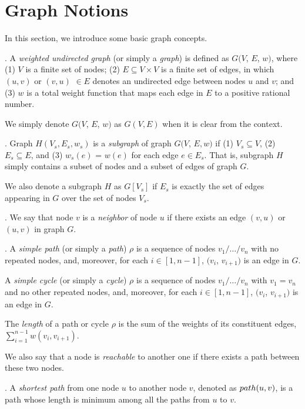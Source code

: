 \section{Graph Notions}
\label{sec-preliminary}

In this section, we introduce some basic graph concepts.

. A {\em weighted undirected graph} (or simply a {\em graph})
is defined as $G (V$, $E$, $w)$, where
(1) $V$ is a finite set of nodes;
(2) $E\subseteq V \times V$ is a finite set of edges, in which $(u, v)$ or $(v, u)$ $\in E$ denotes an undirected edge between nodes $u$ and $v$; and
(3) $w$ is a total weight function that maps each edge in $E$ to a positive rational number.

We simply denote $G (V$, $E$, $w)$ as  $G(V, E)$ when it is clear from the context.

. Graph $H(V_s, E_s,  w_{s})$ is a {\em subgraph} of graph
$G(V$, $E,  w)$ if (1) $V_s \subseteq V$, (2) $E_s \subseteq E$, and (3) $w_{s}(e)$ = $w(e)$ for each edge $e\in E_s$.
%
That is, subgraph $H$ simply contains a subset of nodes and a subset of edges of graph $G$.

We also denote a subgraph $H$ as $G[V_s]$ if $E_s$ is exactly the set of edges appearing in $G$ over the set of nodes $V_s$.


. We say that node $v$ is a {\em neighbor} of node $u$ if there exists an edge $(v, u)$ or $(u, v)$ in graph $G$.


.
A {\em simple path} (or simply a {\em path}) $\rho$ is
a sequence of nodes $v_1/\ldots/v_n$ with no repeated nodes, and, moreover, for each $i\in[1, n-1]$, $(v_i$, $v_{i+1})$ is an edge in $G$.

A {\em simple cycle} (or simply a {\em cycle}) $\rho$ is
a sequence of nodes $v_1/\ldots/v_n$ with $v_1 = v_n$ and no other repeated nodes, and, moreover, for each $i\in[1, n-1]$, $(v_i$, $v_{i+1})$ is an edge in $G$.


The {\em length} of a path or cycle $\rho$ is
the sum of the weights of its constituent edges, \ie $\sum_{i=1}^{n-1} w(v_i, v_{i+1})$.


We also say that a node is {\em reachable} to another one if there exists a path between these two nodes.




.
A {\em shortest path} from one node $u$ to another node $v$, denoted as $\path(u, v)$, is a path whose length is minimum among all the paths from $u$ to $v$.


